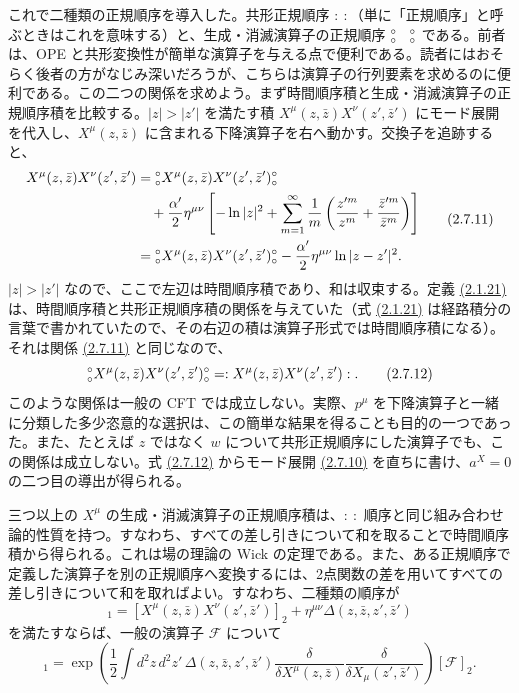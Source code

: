 これで二種類の正規順序を導入した。共形正規順序 $:\ :$（単に「正規順序」と呼ぶときはこれを意味する）と、生成・消滅演算子の正規順序 $\canorm{\phantom X}$ である。前者は、OPE と共形変換性が簡単な演算子を与える点で便利である。読者にはおそらく後者の方がなじみ深いだろうが、こちらは演算子の行列要素を求めるのに便利である。この二つの関係を求めよう。まず時間順序積と生成・消滅演算子の正規順序積を比較する。$|z|>|z'|$ を満たす積 $X^\mu(z,\bar z)X^\nu(z',\bar z')$ にモード展開を代入し、$X^\mu(z,\bar z)$ に含まれる下降演算子を右へ動かす。交換子を追跡すると、
\begin{equation}
\begin{aligned}
X^\mu(z,\bar z)X^\nu(z',\bar z')
&=\mathopen{{}^{\circ}_{\circ}}X^\mu(z,\bar z)X^\nu(z',\bar z')\mathclose{{}^{\circ}_{\circ}}\\
&\quad+\frac{\alpha'}2\eta^{\mu\nu}
\left[-\ln|z|^2+\sum_{m=1}^{\infty}\frac1m
\left(\frac{z'^m}{z^m}+\frac{\bar z'^m}{\bar z^m}\right)\right]\\
&=\mathopen{{}^{\circ}_{\circ}}X^\mu(z,\bar z)X^\nu(z',\bar z')\mathclose{{}^{\circ}_{\circ}}
-\frac{\alpha'}2\eta^{\mu\nu}\ln|z-z'|^2.
\end{aligned}
\tag{2.7.11}\label{eq:2.7.11}
\end{equation}
$|z|>|z'|$ なので、ここで左辺は時間順序積であり、和は収束する。定義 \hyperref[eq:2.1.21a]{(2.1.21)} は、時間順序積と共形正規順序積の関係を与えていた（式 \hyperref[eq:2.1.21a]{(2.1.21)} は経路積分の言葉で書かれていたので、その右辺の積は演算子形式では時間順序積になる）。それは関係 \hyperref[eq:2.7.11]{(2.7.11)} と同じなので、
\begin{equation}
\mathopen{{}^{\circ}_{\circ}}X^\mu(z,\bar z)X^\nu(z',\bar z')\mathclose{{}^{\circ}_{\circ}}
=:X^\mu(z,\bar z)X^\nu(z',\bar z'):.
\tag{2.7.12}\label{eq:2.7.12}
\end{equation}
このような関係は一般の CFT では成立しない。実際、$p^\mu$ を下降演算子と一緒に分類した多少恣意的な選択は、この簡単な結果を得ることも目的の一つであった。また、たとえば $z$ ではなく $w$ について共形正規順序にした演算子でも、この関係は成立しない。式 \hyperref[eq:2.7.12]{(2.7.12)} からモード展開 \hyperref[eq:2.7.10]{(2.7.10)} を直ちに書け、$a^X=0$ の二つ目の導出が得られる。

三つ以上の $X^\mu$ の生成・消滅演算子の正規順序積は、$:\ :$ 順序と同じ組み合わせ論的性質を持つ。すなわち、すべての差し引きについて和を取ることで時間順序積から得られる。これは場の理論の Wick の定理である。また、ある正規順序で定義した演算子を別の正規順序へ変換するには、2点関数の差を用いてすべての差し引きについて和を取ればよい。すなわち、二種類の順序が
\begin{equation}
[X^\mu(z,\bar z)X^\nu(z',\bar z')]_1
=[X^\mu(z,\bar z)X^\nu(z',\bar z')]_2
+\eta^{\mu\nu}\Delta(z,\bar z,z',\bar z')
\tag{2.7.13}\label{eq:2.7.13}
\end{equation}
を満たすならば、一般の演算子 $\mathcal F$ について
\begin{equation}
[\mathcal F]_1=
\exp\left(\frac12\int d^2z\,d^2z'\,
\Delta(z,\bar z,z',\bar z')
\frac{\delta}{\delta X^\mu(z,\bar z)}
\frac{\delta}{\delta X_\mu(z',\bar z')}\right)[\mathcal F]_2.
\tag{2.7.14}\label{eq:2.7.14}
\end{equation}


